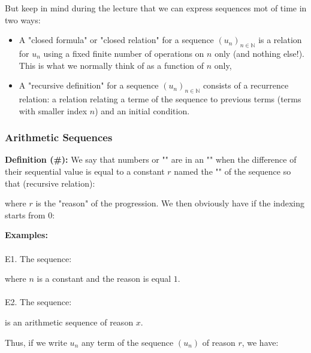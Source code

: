 	But keep in mind during the lecture that we can express sequences mot of time in two ways:
	\begin{itemize}
		\item A "closed formula" or "closed relation" for a sequence $(u_n)_{n\in\mathbb{N}}$ is a relation for $u_n$ using a fixed finite number of operations on $n$ only (and nothing else!). This is what we normally think of as a function of $n$ only,
	
		\item A "recursive definition" for a sequence $(u_n)_{n\in\mathbb{N}}$ consists of a recurrence relation: a relation relating a terme of the sequence to previous terms (terms with smaller index $n$) and an initial condition.
	\end{itemize}
	
	\pagebreak
\subsubsection{Arithmetic Sequences}

\textbf{Definition (\#\mydef):} We say that numbers or "" are in an "" when the difference of their sequential value is equal to a constant $r$ named the "" of the sequence so that (recursive relation):
	
where $r$ is the "reason" of the progression. We then obviously have if the indexing starts from $0$:
	
	\begin{tcolorbox}[colframe=black,colback=white,sharp corners]
\textbf{{\Large {}}Examples:}\\\\
E1. The sequence:
	
where $n$ is a constant and the reason is equal $1$.\\\\
E2. The sequence:
	
	is an arithmetic sequence of reason $x$.
	\end{tcolorbox}
	Thus, if we write $u_n$ any term of the sequence $(u_n)$ of reason $r$, we have:
	
